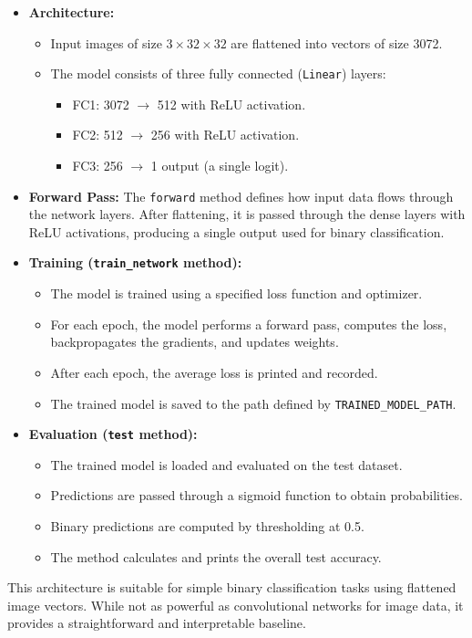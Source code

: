 \begin{itemize}
    \item \textbf{Architecture:}
    \begin{itemize}
        \item Input images of size $3 \times 32 \times 32$ are flattened into vectors of size 3072.
        \item The model consists of three fully connected (\texttt{Linear}) layers:
        \begin{itemize}
            \item FC1: 3072 $\rightarrow$ 512 with ReLU activation.
            \item FC2: 512 $\rightarrow$ 256 with ReLU activation.
            \item FC3: 256 $\rightarrow$ 1 output (a single logit).
        \end{itemize}
    \end{itemize}

    \item \textbf{Forward Pass:}
    The \texttt{forward} method defines how input data flows through the network layers. After flattening, it is passed through the dense layers with ReLU activations, producing a single output used for binary classification.

    \item \textbf{Training (\texttt{train\_network} method):}
    \begin{itemize}
        \item The model is trained using a specified loss function and optimizer.
        \item For each epoch, the model performs a forward pass, computes the loss, backpropagates the gradients, and updates weights.
        \item After each epoch, the average loss is printed and recorded.
        \item The trained model is saved to the path defined by \texttt{TRAINED\_MODEL\_PATH}.
    \end{itemize}

    \item \textbf{Evaluation (\texttt{test} method):}
    \begin{itemize}
        \item The trained model is loaded and evaluated on the test dataset.
        \item Predictions are passed through a sigmoid function to obtain probabilities.
        \item Binary predictions are computed by thresholding at 0.5.
        \item The method calculates and prints the overall test accuracy.
    \end{itemize}
\end{itemize}

This architecture is suitable for simple binary classification tasks using flattened image vectors. While not as powerful as convolutional networks for image data, it provides a straightforward and interpretable baseline.
